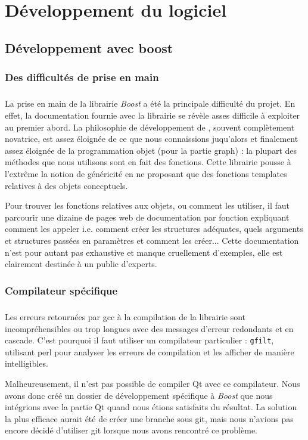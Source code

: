 \section{Développement du logiciel}
\subsection{Développement avec boost}
\subsubsection{Des difficultés de prise en main}
\subparagraph{}
La prise en main de la librairie \textit{Boost} a été la principale difficulté du projet. En effet, la documentation fournie avec la librairie se r\'ev\`ele asses difficile \`a exploiter au premier abord. La philosophie de développement de \boost, souvent compl\`etement novatrice, est assez éloignée de ce que nous connaissions juqu'alors et finalement assez éloignée de la programmation objet (pour la partie graph) : la plupart des méthodes que nous utilisons sont en fait des fonctions. Cette librairie pousse \`a l'extr\^eme la notion de g\'en\'ericit\'e en ne proposant que des fonctions templates relatives \`a des objets conecptuels.

Pour trouver les fonctions relatives aux objets, ou comment les utiliser, il faut parcourir une dizaine de pages web de documentation par fonction expliquant comment les appeler i.e. comment créer les structures adéquates, quels arguments et structures passées en paramètres et comment les créer... Cette documentation n'est pour autant pas exhaustive et manque cruellement d'exemples, elle est clairement destinée à un public d'experts.

\subsubsection {Compilateur spécifique}
\subparagraph{}
Les erreurs retournées par gcc à la compilation de la librairie sont incompréhensibles ou trop longues avec des messages d'erreur redondants et en cascade. C'est pourquoi il faut utiliser un compilateur particulier : \verb|gfilt|, utilisant perl pour analyser les erreurs de compilation et les afficher de mani\`ere intelligibles. 

Malheureusement, il n'est pas possible de compiler Qt avec ce compilateur. Nous avons donc créé un dossier de développement spécifique à \textit{Boost} que nous int\'egrions avec la partie Qt quand nous étions satisfaits du résultat. La solution la plus efficace aurait été de créer une branche sous git, mais nous n'avions pas encore décidé d'utiliser git lorsque nous avons rencontré ce problème.

